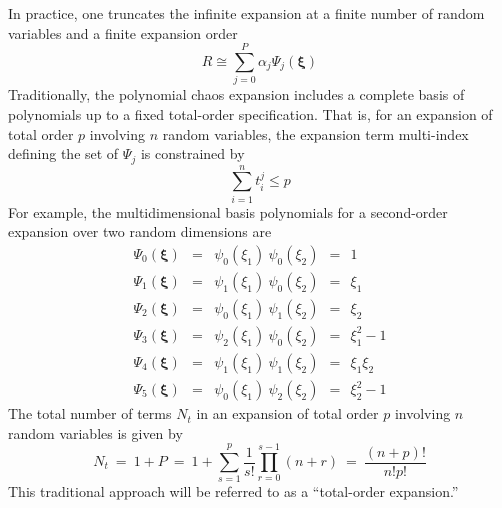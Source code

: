 In practice, one truncates the infinite expansion at a finite number
of random variables and a finite expansion order
\begin{equation}
R \cong \sum_{j=0}^P \alpha_j \Psi_j(\boldsymbol{\xi})
\label{eq:pc_exp_trunc}
\end{equation}
Traditionally, the polynomial chaos expansion includes a complete
basis of polynomials up to a fixed total-order specification.  That is,
for an expansion of total order $p$ involving $n$ random variables, the 
expansion term multi-index defining the set of $\Psi_j$ is constrained by
\begin{equation}
\sum_{i=1}^{n} t_i^j \leq p \label{eq:to_multi_index}
\end{equation}
For example, the multidimensional basis polynomials for a second-order
expansion over two random dimensions are
\begin{eqnarray}
\Psi_0(\boldsymbol{\xi}) & = & \psi_0(\xi_1) ~ \psi_0(\xi_2) ~~=~~ 1 
\nonumber \\
\Psi_1(\boldsymbol{\xi}) & = & \psi_1(\xi_1) ~ \psi_0(\xi_2) ~~=~~ \xi_1 
\nonumber \\
\Psi_2(\boldsymbol{\xi}) & = & \psi_0(\xi_1) ~ \psi_1(\xi_2) ~~=~~ \xi_2 
\nonumber \\
\Psi_3(\boldsymbol{\xi}) & = & \psi_2(\xi_1) ~ \psi_0(\xi_2) ~~=~~ \xi_1^2 - 1 
\nonumber \\
\Psi_4(\boldsymbol{\xi}) & = & \psi_1(\xi_1) ~ \psi_1(\xi_2) ~~=~~ \xi_1 \xi_2 
\nonumber \\
\Psi_5(\boldsymbol{\xi}) & = & \psi_0(\xi_1) ~ \psi_2(\xi_2) ~~=~~ \xi_2^2 - 1 
\nonumber 
\end{eqnarray}
The total number of terms $N_t$ in an expansion of total order
$p$ involving $n$ random variables is given by
\begin{equation}
N_t ~=~ 1 + P ~=~ 1 + \sum_{s=1}^{p} {\frac{1}{s!}} \prod_{r=0}^{s-1} (n+r)
    ~=~ \frac{(n+p)!}{n!p!} \label{eq:num_to_terms}
\end{equation}
This traditional approach will be referred to as a ``total-order
expansion.''

